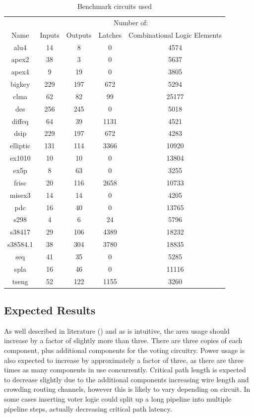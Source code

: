 \documentclass[12pt,drafta4paper,oneside]{memoir} %
\begin{document}
\begin{table}
    \begin{tabular}{c|cccc}
     & \multicolumn{4}{c}{Number of:}\\
     Name & Inputs & Outputs & Latches & Combinational Logic Elements\\
        alu4 & 14 & 8 & 0 & 4574\\
        apex2 & 38 & 3 & 0 & 5637\\
        apex4 & 9 & 19 & 0 & 3805\\     
        bigkey & 229 & 197 & 672 & 5294\\
        clma & 62 & 82 & 99 & 25177\\
        des & 256 & 245 & 0 & 5018\\
        diffeq & 64 & 39 & 1131 & 4521\\
        dsip & 229 & 197 & 672 & 4283\\
        elliptic & 131 & 114 & 3366 & 10920\\
        ex1010 & 10 & 10 & 0 & 13804\\
        ex5p & 8 & 63 & 0 & 3255\\
        frisc & 20 & 116 & 2658 & 10733\\
        misex3 & 14 & 14 & 0 & 4205\\
        pdc & 16 & 40 & 0 & 13765\\
        s298     & 4 & 6 & 24 & 5796\\
        s38417   & 29 & 106 & 4389 & 18232\\
        s38584.1 & 38 & 304 & 3780 & 18835\\
        seq      & 41 & 35 & 0 & 5285\\
        spla     & 16 & 46 & 0 & 11116\\
        tseng    & 52 & 122 & 1155 & 3260
    \end{tabular}
    \caption{Benchmark circuits used}
    \label{benchmarkList}
\end{table}
\subsection{Expected Results}
As well described in literature (\cite{HardeningTechniques}) and as is intuitive, the area usage should increase by a factor of slightly more than three. There are three copies of each component, plus additional components for the voting circuitry. Power usage is also expected to increase by approximately a factor of three, as there are three times as many components in use concurrently. Critical path length is expected to decrease slightly due to the additional components increasing wire length and crowding routing channels, however this is likely to vary depending on circuit. In some cases inserting voter logic could split up a long pipeline into multiple pipeline steps, actually decreasing critical path latency.
\end{document}
